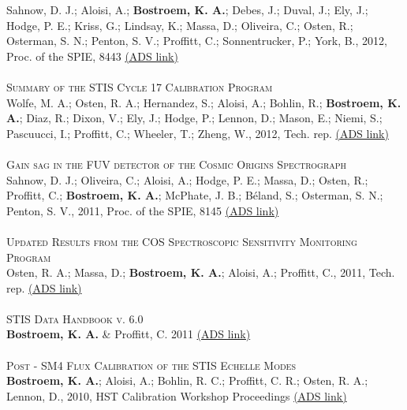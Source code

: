 Sahnow, D. J.; Aloisi, A.; \textbf{Bostroem, K. A.}; Debes, J.; Duval, J.; Ely, J.; Hodge, P. E.; Kriss, G.; Lindsay, K.; Massa, D.; Oliveira, C.; Osten, R.; Osterman, S. N.; Penton, S. V.; Proffitt, C.; Sonnentrucker, P.; York, B., 2012, Proc. of the SPIE, 8443 
\color{blue}\href{https://ui.adsabs.harvard.edu/#abs/2012SPIE.8443E..4CS/abstract}{(ADS link)}\color{black}\\
\\
\textsc{Summary of the STIS Cycle 17 Calibration Program}\\ 
Wolfe, M. A.; Osten, R. A.; Hernandez, S.; Aloisi, A.; Bohlin, R.; \textbf{Bostroem, K. A.}; Diaz, R.; Dixon, V.; Ely, J.; Hodge, P.; Lennon, D.; Mason, E.; Niemi, S.; Pascuucci, I.; Proffitt, C.; Wheeler, T.; Zheng, W., 2012, Tech. rep. 
\color{blue}\href{https://ui.adsabs.harvard.edu/#abs/2012stis.rept....3W/abstract}{(ADS link)}\color{black}\\%
\\
\textsc{Gain sag in the FUV detector of the Cosmic Origins Spectrograph}\\ 
Sahnow, D. J.; Oliveira, C.; Aloisi, A.; Hodge, P. E.; Massa, D.; Osten, R.; Proffitt, C.; \textbf{Bostroem, K. A.}; McPhate, J. B.; B\'{e}land, S.; Osterman, S. N.; Penton, S. V., 2011,  Proc. of the SPIE, 8145 
\color{blue}\href{https://ui.adsabs.harvard.edu/#abs/2011SPIE.8145E..0QS/abstract}{(ADS link)}\color{black}\\ %
\\
\textsc{Updated Results from the COS Spectroscopic Sensitivity Monitoring Program}\\ 
Osten, R. A.; Massa, D.; \textbf{Bostroem, K. A.}; Aloisi, A.; Proffitt, C., 2011, Tech. rep. 
\color{blue}\href{https://ui.adsabs.harvard.edu/#abs/2011cos..rept....2O/abstract}{(ADS link)}\color{black}\\ %
\\
\textsc{STIS Data Handbook v. 6.0}\\ 
{\bf Bostroem, K. A.} \& Proffitt, C. 2011
\color{blue}\href{https://ui.adsabs.harvard.edu/#abs/2011stis.book.....B/abstract}{(ADS link)}\color{black}\\
\\
\textsc{Post - SM4 Flux Calibration of the STIS Echelle Modes}\\ 
\textbf{Bostroem, K. A.}; Aloisi, A.; Bohlin, R. C.; Proffitt, C. R.; Osten, R. A.; Lennon, D., 2010, HST Calibration Workshop Proceedings
\color{blue}\href{https://ui.adsabs.harvard.edu/#abs/2010hstc.workE..51B/abstract}{(ADS link)}\color{black}\\%
